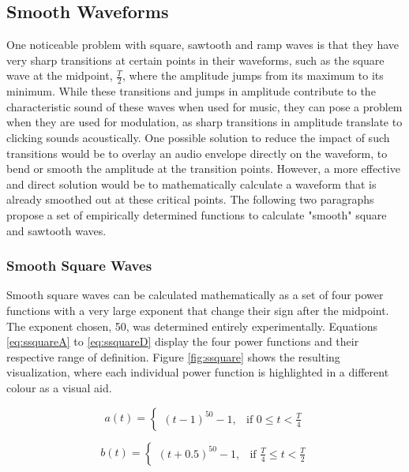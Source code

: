   \subsection{Smooth Waveforms}

  One noticeable problem with square, sawtooth and ramp waves is that they have very sharp transitions at certain points in their waveforms, such as the square wave at the midpoint, $\frac{T}{2}$, where the amplitude jumps from its maximum to its minimum. While these transitions and jumps in amplitude contribute to the characteristic sound of these waves when used for music, they can pose a problem when they are used for modulation, as sharp transitions in amplitude translate to clicking sounds acoustically. One possible solution to reduce the impact of such transitions would be to overlay an audio envelope directly on the waveform, to bend or smooth the amplitude at the transition points. However, a more effective and direct solution would be to mathematically calculate a waveform that is already smoothed out at these critical points. The following two paragraphs propose a set of empirically determined functions to calculate "smooth" square and sawtooth waves.

  \subsubsection{Smooth Square Waves}

  Smooth square waves can be calculated mathematically as a set of four power functions with a very large exponent that change their sign after the midpoint. The exponent chosen, 50, was determined entirely experimentally. Equations \ref{eq:ssquareA} to \ref{eq:ssquareD} display the four power functions and their respective range of definition. Figure \ref{fig:ssquare} shows the resulting visualization, where each individual power function is highlighted in a different colour as a visual aid.

  \begin{equation}
    a(t) =
    \begin{cases}
      (t - 1)^{50} - 1,& \text{if } 0 \leq t < \frac{T}{4}
    \end{cases}
    \label{eq:ssquareA}
  \end{equation}

  \begin{equation}
    b(t) =
    \begin{cases}
      (t + 0.5)^{50} - 1,& \text{if } \frac{T}{4} \leq t < \frac{T}{2}
    \end{cases}
    \label{eq:ssquareB}
  \end{equation}

